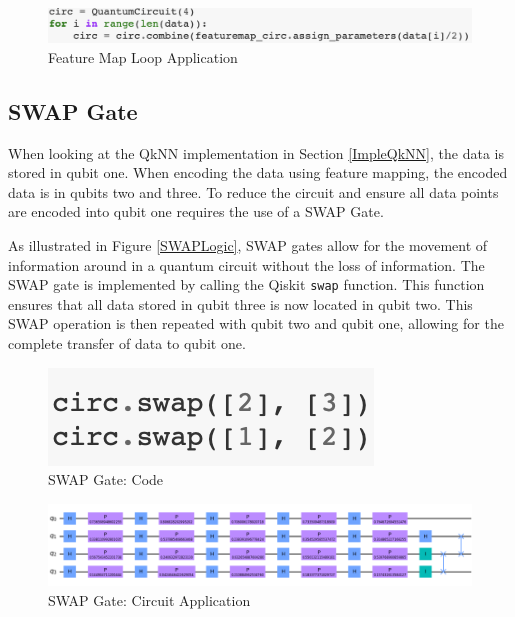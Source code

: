 \begin{figure}[H]
      \centering
      \includegraphics[scale=0.7]{background/FMRun.png}
      \caption{Feature Map Loop Application }
      \label{FMFun}
\end{figure}


\subsection{SWAP Gate}

When looking at the QkNN implementation in Section \ref{ImpleQkNN}, the data is stored in qubit one. When encoding the data using feature mapping, the encoded data is in qubits two and three. To reduce the circuit and ensure all data points are encoded into qubit one requires the use of a SWAP Gate.

As illustrated in Figure \ref{SWAPLogic}, SWAP gates allow for the movement of information around in a quantum circuit without the loss of information. The SWAP gate is implemented by calling the Qiskit \texttt{swap} function. %
This function ensures that all data stored in qubit three is now located in qubit two.
This SWAP operation is then repeated with qubit two and qubit one, allowing for the complete transfer of data to qubit one. 

\begin{figure}[H]
      \centering
      \includegraphics[scale=0.7]{background/SWAPCode.png}
      \caption{SWAP Gate: Code }
      \label{SWCode}
\end{figure}

\begin{figure}[H]
      \centering
      \includegraphics[scale=0.5]{background/SWAPCir.png}
      \caption{SWAP Gate: Circuit Application }
      \label{SWCircuit}
\end{figure}
 

